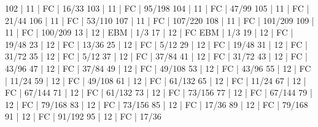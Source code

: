 102   |  11    |    FC                                        | 16/33   
103   |  11    |    FC                                        | 95/198   
104   |  11    |    FC                                        | 47/99   
105   |  11    |    FC                                        | 21/44   
106   |  11    |    FC                                        | 53/110   
107   |  11    |    FC                                        | 107/220   
108   |  11    |    FC                                        | 101/209   
109   |  11    |    FC                                        | 100/209   
13    |  12    |                   EBM                        | 1/3   
17    |  12    |    FC             EBM                        | 1/3   
19    |  12    |    FC                                        | 19/48   
23    |  12    |    FC                                        | 13/36   
25    |  12    |    FC                                        | 5/12   
29    |  12    |    FC                                        | 19/48   
31    |  12    |    FC                                        | 31/72   
35    |  12    |    FC                                        | 5/12   
37    |  12    |    FC                                        | 37/84   
41    |  12    |    FC                                        | 31/72   
43    |  12    |    FC                                        | 43/96   
47    |  12    |    FC                                        | 37/84   
49    |  12    |    FC                                        | 49/108   
53    |  12    |    FC                                        | 43/96   
55    |  12    |    FC                                        | 11/24   
59    |  12    |    FC                                        | 49/108   
61    |  12    |    FC                                        | 61/132   
65    |  12    |    FC                                        | 11/24   
67    |  12    |    FC                                        | 67/144   
71    |  12    |    FC                                        | 61/132   
73    |  12    |    FC                                        | 73/156   
77    |  12    |    FC                                        | 67/144   
79    |  12    |    FC                                        | 79/168   
83    |  12    |    FC                                        | 73/156   
85    |  12    |    FC                                        | 17/36   
89    |  12    |    FC                                        | 79/168   
91    |  12    |    FC                                        | 91/192   
95    |  12    |    FC                                        | 17/36   
